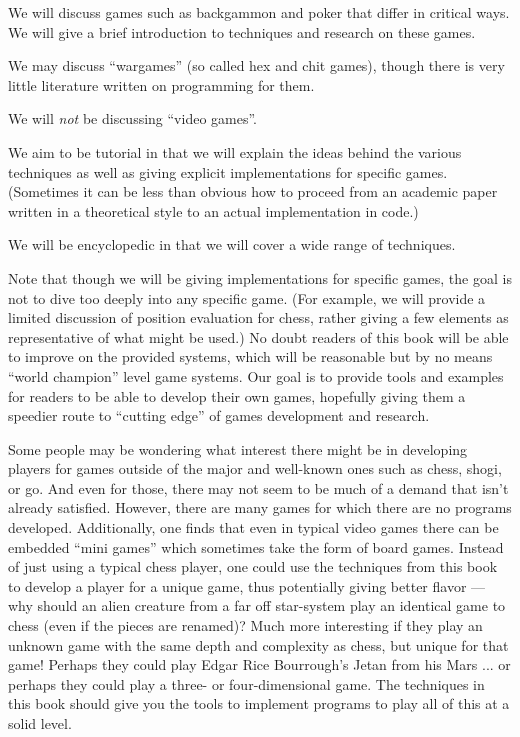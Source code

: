 \documentclass[10pt,dvipdfmx,letterpaper]{report}
\begin{document}
We will discuss games such as backgammon and poker that differ in critical ways.  We will give
a brief introduction to techniques and research on these games.

We may discuss ``wargames'' (so called hex and chit games), though there is very little
literature written on programming for them.

We will {\em not} be discussing ``video games''.

We aim to be tutorial in that we will explain the ideas behind the various techniques as well
as giving explicit implementations for specific games.  (Sometimes it can be less than obvious
how to proceed from an academic paper written in a theoretical style to an actual implementation
in code.)

We will be encyclopedic in that we will cover a wide range of techniques.

Note that though we will be giving implementations for specific games, the goal is not to
dive too deeply into any specific game.  (For example, we will provide a limited discussion of
position evaluation for chess, rather giving a few elements as representative of what might
be used.)  No doubt readers of this book will be able to improve on the provided systems, which will
be reasonable but by no means ``world champion'' level game systems.  Our goal is to provide
tools and examples for readers to be able to develop their own games, hopefully giving them
a speedier route to ``cutting edge'' of games development and research.

Some people may be wondering what interest there might be in developing players for
games outside of the major and well-known ones such as chess, shogi, or go.  And even for those,
there may not seem to be much of a demand that isn't already satisfied.
However, there are many games for which there are no programs developed.
Additionally, one finds that even in typical video games there can be embedded ``mini games''
which sometimes take the form of board games.  Instead of just using a typical chess player,
one could use the techniques from this book to develop a player for a unique game,
thus potentially giving better flavor --- why should an alien creature from a far off star-system
play an identical game to chess (even if the pieces are renamed)?  Much more interesting if
they play an unknown game with the same depth and complexity as chess, but unique for that game!
Perhaps they could play Edgar Rice Bourrough's Jetan from his Mars ... or perhaps they could play
a three- or four-dimensional game.  The techniques in this book should give you the tools to implement
programs to play all of this at a solid level.
\end{document}
